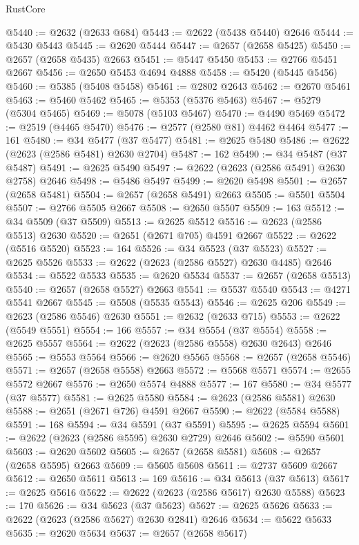 \begin{lexlean}{RustCore}
\begin{coremodule}
@5440 := @2632 (@2633 @684)
@5443 := @2622 (@5438 @5440) @2646
@5444 := @5430 @5443
@5445 := @2620 @5444
@5447 := @2657 (@2658 @5425)
@5450 := @2657 (@2658 @5435) @2663
@5451 := @5447 @5450
@5453 := @2766 @5451 @2667
@5456 := @2650 @5453 @4694 @4888
@5458 := @5420 (@5445 @5456)
@5460 := @5385 (@5408 @5458)
@5461 := @2802 @2643
@5462 := @2670 @5461
@5463 := @5460 @5462
@5465 := @5353 (@5376 @5463)
@5467 := @5279 (@5304 @5465)
@5469 := @5078 (@5103 @5467)
@5470 := @4490 @5469
@5472 := @2519 (@4465 @5470)
@5476 := @2577 (@2580 @81) @4462 @4464
@5477 := 161
@5480 := @34 @5477 (@37 @5477)
@5481 := @2625 @5480
@5486 := @2622 (@2623 (@2586 @5481) @2630 @2704)
@5487 := 162
@5490 := @34 @5487 (@37 @5487)
@5491 := @2625 @5490
@5497 := @2622 (@2623 (@2586 @5491) @2630 @2758) @2646
@5498 := @5486 @5497
@5499 := @2620 @5498
@5501 := @2657 (@2658 @5481)
@5504 := @2657 (@2658 @5491) @2663
@5505 := @5501 @5504
@5507 := @2766 @5505 @2667
@5508 := @2650 @5507
@5509 := 163
@5512 := @34 @5509 (@37 @5509)
@5513 := @2625 @5512
@5516 := @2623 (@2586 @5513) @2630
@5520 := @2651 (@2671 @705) @4591 @2667
@5522 := @2622 (@5516 @5520)
@5523 := 164
@5526 := @34 @5523 (@37 @5523)
@5527 := @2625 @5526
@5533 := @2622 (@2623 (@2586 @5527) @2630 @4485) @2646
@5534 := @5522 @5533
@5535 := @2620 @5534
@5537 := @2657 (@2658 @5513)
@5540 := @2657 (@2658 @5527) @2663
@5541 := @5537 @5540
@5543 := @4271 @5541 @2667
@5545 := @5508 (@5535 @5543)
@5546 := @2625 @206
@5549 := @2623 (@2586 @5546) @2630
@5551 := @2632 (@2633 @715)
@5553 := @2622 (@5549 @5551)
@5554 := 166
@5557 := @34 @5554 (@37 @5554)
@5558 := @2625 @5557
@5564 := @2622 (@2623 (@2586 @5558) @2630 @2643) @2646
@5565 := @5553 @5564
@5566 := @2620 @5565
@5568 := @2657 (@2658 @5546)
@5571 := @2657 (@2658 @5558) @2663
@5572 := @5568 @5571
@5574 := @2655 @5572 @2667
@5576 := @2650 @5574 @4888
@5577 := 167
@5580 := @34 @5577 (@37 @5577)
@5581 := @2625 @5580
@5584 := @2623 (@2586 @5581) @2630
@5588 := @2651 (@2671 @726) @4591 @2667
@5590 := @2622 (@5584 @5588)
@5591 := 168
@5594 := @34 @5591 (@37 @5591)
@5595 := @2625 @5594
@5601 := @2622 (@2623 (@2586 @5595) @2630 @2729) @2646
@5602 := @5590 @5601
@5603 := @2620 @5602
@5605 := @2657 (@2658 @5581)
@5608 := @2657 (@2658 @5595) @2663
@5609 := @5605 @5608
@5611 := @2737 @5609 @2667
@5612 := @2650 @5611
@5613 := 169
@5616 := @34 @5613 (@37 @5613)
@5617 := @2625 @5616
@5622 := @2622 (@2623 (@2586 @5617) @2630 @5588)
@5623 := 170
@5626 := @34 @5623 (@37 @5623)
@5627 := @2625 @5626
@5633 := @2622 (@2623 (@2586 @5627) @2630 @2841) @2646
@5634 := @5622 @5633
@5635 := @2620 @5634
@5637 := @2657 (@2658 @5617)

\end{coremodule}
\end{lexlean}
